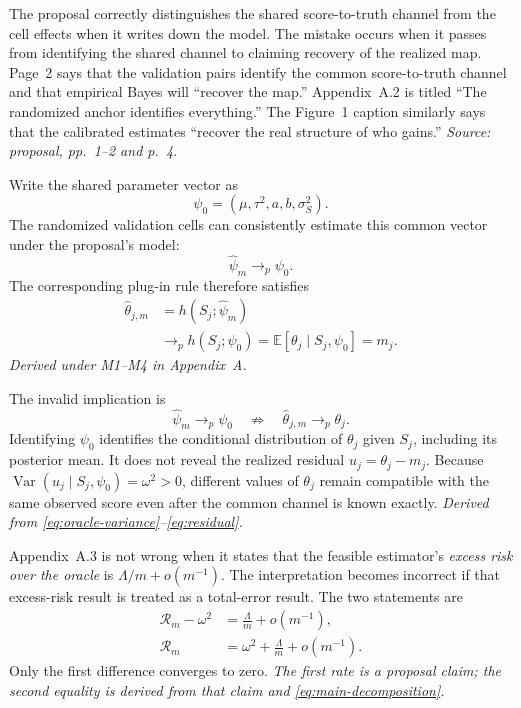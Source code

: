 \documentclass[11pt]{article}
\newcommand{\E}{\mathbb E}
\newcommand{\Var}{\operatorname{Var}}
\begin{document}
The proposal correctly distinguishes the shared score-to-truth channel from
the cell effects when it writes down the model. The mistake occurs when it
passes from identifying the shared channel to claiming recovery of the
realized map. Page~2 says that the validation pairs identify the common
score-to-truth channel and that empirical Bayes will ``recover the map.''
Appendix~A.2 is titled ``The randomized anchor identifies everything.'' The
Figure~1 caption similarly says that the calibrated estimates ``recover the
real structure of who gains.'' \emph{Source: proposal, pp.~1--2 and p.~4.}

Write the shared parameter vector as
\begin{equation}
 \psi_0=(\mu,\tau^2,a,b,\sigma_S^2).
 \label{eq:shared-parameter-vector}
\end{equation}
The randomized validation cells can consistently estimate this common
vector under the proposal's model:
\begin{equation}
 \widehat\psi_m\longrightarrow_p\psi_0.
 \label{eq:shared-parameter-consistency}
\end{equation}
The corresponding plug-in rule therefore satisfies
\begin{align}
 \widehat\theta_{j,m}
 &=h(S_j;\widehat\psi_m) \\
 &\longrightarrow_p h(S_j;\psi_0)
 =\E[\theta_j\mid S_j,\psi_0]
 =m_j.
 \label{eq:oracle-not-truth}
\end{align}
\emph{Derived under M1--M4 in Appendix~A.}

The invalid implication is
\begin{equation}
 \widehat\psi_m\longrightarrow_p\psi_0
 \quad\not\Longrightarrow\quad
 \widehat\theta_{j,m}\longrightarrow_p\theta_j.
 \label{eq:invalid-implication}
\end{equation}
Identifying \(\psi_0\) identifies the conditional distribution of
\(\theta_j\) given \(S_j\), including its posterior mean. It does not reveal
the realized residual \(u_j=\theta_j-m_j\). Because
\(\Var(u_j\mid S_j,\psi_0)=\omega^2>0\), different values of \(\theta_j\)
remain compatible with the same observed score even after the common channel
is known exactly. \emph{Derived from
\eqref{eq:oracle-variance}--\eqref{eq:residual}.}

Appendix~A.3 is not wrong when it states that the feasible estimator's
\emph{excess risk over the oracle} is
\(\Lambda/m+o(m^{-1})\). The interpretation becomes incorrect if that
excess-risk result is treated as a total-error result. The two statements are
\begin{align}
 \mathcal R_m-\omega^2
 &=\frac{\Lambda}{m}+o(m^{-1}),
 \label{eq:proposal-excess-risk}\\
 \mathcal R_m
 &=\omega^2+\frac{\Lambda}{m}+o(m^{-1}).
 \label{eq:proposal-total-risk}
\end{align}
Only the first difference converges to zero. \emph{The first rate is a
proposal claim; the second equality is derived from that claim and
\eqref{eq:main-decomposition}.}
\end{document}
